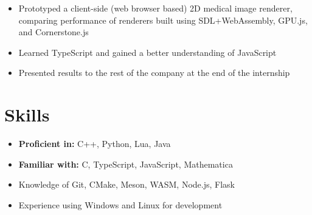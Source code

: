 \documentclass{article}
\begin{document}
		\begin{itemize}
			\item Prototyped a client-side (web browser based) 2D medical image renderer, comparing performance of renderers built using SDL+WebAssembly, GPU.js, and Cornerstone.js
			\item Learned TypeScript and gained a better understanding of JavaScript
			\item Presented results to the rest of the company at the end of the internship
		\end{itemize}
	
	\section*{Skills}
		\begin{itemize}
			\item \textbf{Proficient in:} C++, Python, Lua, Java
			\item \textbf{Familiar with:} C, TypeScript, JavaScript, Mathematica
			\item Knowledge of Git, CMake, Meson, WASM, Node.js, Flask
			\item Experience using Windows and Linux for development
		\end{itemize}
	
\end{document}
